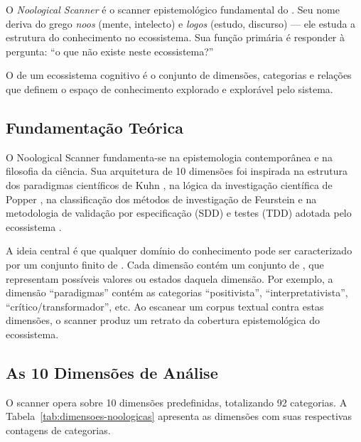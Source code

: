 O \emph{Noological Scanner} é o scanner epistemológico fundamental do
\opencodeeco{}. Seu nome deriva do grego \emph{noos} (mente, intelecto)
e \emph{logos} (estudo, discurso) --- ele estuda a estrutura do
conhecimento no ecossistema. Sua função primária é responder à pergunta:
``o que não existe neste ecossistema?''

\begin{definicao}
O  de um ecossistema cognitivo é o conjunto de
dimensões, categorias e relações que definem o espaço de conhecimento
explorado e explorável pelo sistema.
\end{definicao}

\subsection{Fundamentação Teórica}

O Noological Scanner fundamenta-se na epistemologia contemporânea e na
filosofia da ciência. Sua arquitetura de 10 dimensões foi inspirada na
estrutura dos paradigmas científicos de Kuhn \cite{kuhn1998estrutura},
na lógica da investigação científica de Popper \cite{popper2005logica},
na classificação dos métodos de investigação de Feurstein
\cite{feuerstein2002estatistica} e na metodologia de validação por
especificação (SDD) e testes (TDD) adotada pelo ecossistema
\cite{opencode2026spec028, beck2002tdd}.

A ideia central é que qualquer domínio do conhecimento pode ser
caracterizado por um conjunto finito de . Cada dimensão contém um conjunto de ,
que representam possíveis valores ou estados daquela dimensão. Por exemplo,
a dimensão ``paradigmas'' contém as categorias ``positivista'',
``interpretativista'', ``crítico/transformador'', etc. Ao escanear um corpus
textual contra estas dimensões, o scanner produz um retrato da cobertura
epistemológica do ecossistema.

\subsection{As 10 Dimensões de Análise}

O scanner opera sobre 10 dimensões predefinidas, totalizando 92 categorias.
A Tabela~\ref{tab:dimensoes-noologicas} apresenta as dimensões com suas
respectivas contagens de categorias.


